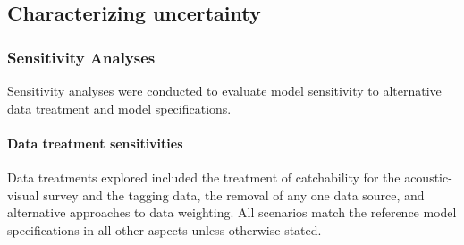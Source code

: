 \documentclass[11pt,
  letterpaper,
]{article}
\begin{document}
\hypertarget{characterizing-uncertainty}{%
\subsection{Characterizing uncertainty}\label{characterizing-uncertainty}}

\hypertarget{sensitivity-analyses}{%
\subsubsection{Sensitivity Analyses}\label{sensitivity-analyses}}

Sensitivity analyses were conducted to evaluate model sensitivity to alternative data treatment and model specifications.

\hypertarget{data-treatment-sensitivities-1}{%
\paragraph{Data treatment sensitivities}\label{data-treatment-sensitivities-1}}

Data treatments explored included the treatment of catchability for the acoustic-visual survey and the tagging data, the removal of any one data source, and alternative approaches to data weighting. All scenarios match the reference model specifications in all other aspects unless otherwise stated.
\end{document}
